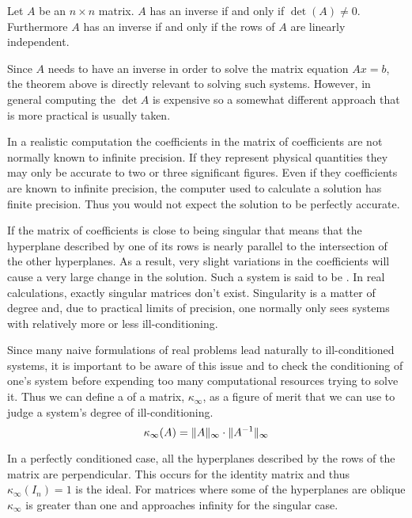 \begin{theorem}
  Let $A$ be an $n \times n$ matrix. $A$ has an inverse if and only if $\det(A) \neq 0$.
  Furthermore $A$ has an inverse if and only if the rows of $A$ are linearly independent.
\end{theorem}


Since $A$ needs to have an inverse in order to solve the matrix equation $Ax = b$, the theorem
above is directly relevant to solving such systems. However, in general computing the $\det{A}$
is expensive so a somewhat different approach that is more practical is usually taken.

In a realistic computation the coefficients in the matrix of coefficients are not normally known
to infinite precision. If they represent physical quantities they may only be accurate to two or
three significant figures. Even if they coefficients are known to infinite precision, the
computer used to calculate a solution has finite precision. Thus you would not expect the
solution to be perfectly accurate.

If the matrix of coefficients is close to being singular that means that the hyperplane
described by one of its rows is nearly parallel to the intersection of the other hyperplanes. As
a result, very slight variations in the coefficients will cause a very large change in the
solution. Such a system is said to be . In real calculations, exactly
singular matrices don't exist. Singularity is a matter of degree and, due to practical limits of
precision, one normally only sees systems with relatively more or less ill-conditioning.

Since many naive formulations of real problems lead naturally to ill-conditioned systems, it is
important to be aware of this issue and to check the conditioning of one's system before
expending too many computational resources trying to solve it. Thus we can define a
 of a matrix, $\kappa_\infty$, as a figure of merit that we can use to
judge a system's degree of ill-conditioning.
\begin{displaymath}
  \kappa_\infty(A) = \|A\|_\infty \cdot \|A^{-1}\|_\infty
\end{displaymath}

In a perfectly conditioned case, all the hyperplanes described by the rows of the matrix are
perpendicular. This occurs for the identity matrix and thus $\kappa_\infty(I_n) = 1$ is the
ideal. For matrices where some of the hyperplanes are oblique $\kappa_\infty$ is greater than
one and approaches infinity for the singular case.

